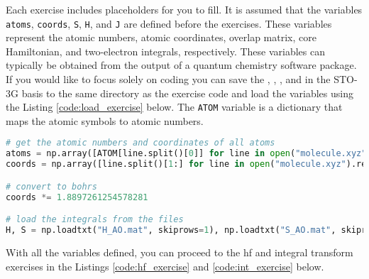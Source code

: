 Each exercise includes placeholders for you to fill. It is assumed that the variables \texttt{\lstinline!atoms!}, \texttt{\lstinline!coords!}, \texttt{\lstinline!S!}, \texttt{\lstinline!H!}, and \texttt{\lstinline!J!} are defined before the exercises. These variables represent the atomic numbers, atomic coordinates, overlap matrix, core Hamiltonian, and two-electron integrals, respectively. These variables can typically be obtained from the output of a quantum chemistry software package. If you would like to focus solely on coding you can save the , , , and  in the STO-3G basis to the same directory as the exercise code and load the variables using the Listing \ref{code:load_exercise} below. The \texttt{\lstinline!ATOM!} variable is a dictionary that maps the atomic symbols to atomic numbers.

\raggedbottom\begin{lstlisting}[language=Python, caption={Example loading of molecule and integrals over atomic basis functions into variables used throughout exercises. The snippet expects the molecule and integral files to b present in the same directory as the script.}, label=code:load_exercise]
# get the atomic numbers and coordinates of all atoms
atoms = np.array([ATOM[line.split()[0]] for line in open("molecule.xyz").readlines()[2:]], dtype=int)
coords = np.array([line.split()[1:] for line in open("molecule.xyz").readlines()[2:]], dtype=float)

# convert to bohrs
coords *= 1.8897261254578281

# load the integrals from the files
H, S = np.loadtxt("H_AO.mat", skiprows=1), np.loadtxt("S_AO.mat", skiprows=1); J = np.loadtxt("J_AO.mat", skiprows=1).reshape(4 * [S.shape[1]])
\end{lstlisting}

With all the variables defined, you can proceed to the \acrshort{hf} and integral transform exercises in the Listings \ref{code:hf_exercise} and \ref{code:int_exercise} below.

